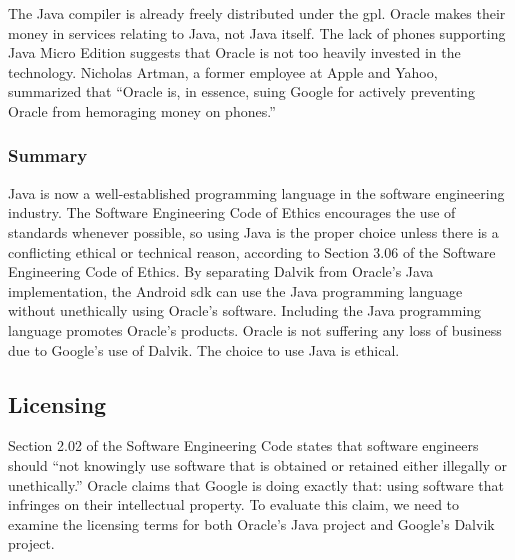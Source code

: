 \documentclass[11pt]{article}
\begin{document}
\begin{multicols}{2}
The Java compiler is already freely distributed under the \gls{gpl}.  Oracle
makes their money in services relating to Java, not Java itself.  The lack of
phones supporting Java Micro Edition suggests that Oracle is not too heavily
invested in the technology.  Nicholas Artman, a former employee at Apple and
Yahoo, summarized that ``Oracle is, in essence, suing Google for actively
preventing Oracle from hemoraging money on phones.'' \cite{artman}


\subsubsection{Summary} %
\label{ssub:java-summary}

Java is now a well-established programming language in the software engineering
industry.  The Software Engineering Code of Ethics encourages the use of
standards whenever possible, so using Java is the proper choice unless there is
a conflicting ethical or technical reason, according to Section 3.06 of the
Software Engineering Code of Ethics. \cite[\S3.06]{secode}  By separating Dalvik
from Oracle's Java implementation, the Android \gls{sdk} can use the Java
programming language without unethically using Oracle's software.  Including the
Java programming language promotes Oracle's products.  Oracle is not suffering
any loss of business due to Google's use of Dalvik.  The choice to use Java is
ethical.



\subsection{Licensing} %
\label{sub:licensing}

Section 2.02 of the Software Engineering Code states that software engineers
should ``not knowingly use software that is obtained or retained either
illegally or unethically.'' \cite[\S 2.02]{secode}  Oracle claims that Google is
doing exactly that: using software that infringes on their intellectual
property.  To evaluate this claim, we need to examine the licensing terms for
both Oracle's Java project and Google's Dalvik project.


\end{multicols}
\end{document}
